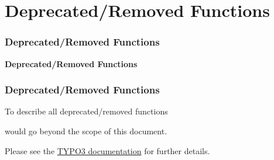 %

\section{Deprecated/Removed Functions}
\begin{frame}[fragile]
	\frametitle{Deprecated/Removed Functions}

	\begin{center}\huge{\color{typo3darkgrey}\textbf{Deprecated/Removed Functions}}\end{center}
	\begin{center}\large{\textit{}}\end{center}

\end{frame}


\begin{frame}[fragile]
	\frametitle{Deprecated/Removed Functions}

	\vspace{1cm}
	\begin{center}
		To describe all deprecated/removed functions
	\end{center}
	\vspace{-0.8cm}
	\begin{center}
		 would go beyond the scope of this document.
	\end{center}
	\vspace{-0.6cm}
	\begin{center}
		Please see the \href{https://docs.typo3.org/typo3cms/extensions/core/latest/Changelog-9.html}{TYPO3 documentation} for further details.
	\end{center}

\end{frame}

